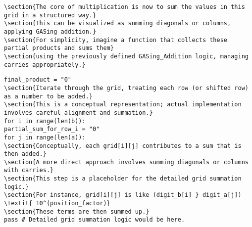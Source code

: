\begin{verbatim}
\section{The core of multiplication is now to sum the values in this grid in a structured way.}
\section{This can be visualized as summing diagonals or columns, applying GASing addition.}
\section{For simplicity, imagine a function that collects these partial products and sums them}
\section{using the previously defined GASing_Addition logic, managing carries appropriately.}
\end{verbatim}

\begin{verbatim}
final_product = "0"
\section{Iterate through the grid, treating each row (or shifted row) as a number to be added.}
\section{This is a conceptual representation; actual implementation involves careful alignment and summation.}
for i in range(len(b)):
partial_sum_for_row_i = "0"
for j in range(len(a)):
\section{Conceptually, each grid[i][j] contributes to a sum that is then added.}
\section{A more direct approach involves summing diagonals or columns with carries.}
\section{This step is a placeholder for the detailed grid summation logic.}
\section{For instance, grid[i][j] is like (digit_b[i] } digit_a[j]) \textit{ 10^(position_factor)}
\section{These terms are then summed up.}
pass # Detailed grid summation logic would be here.
\end{verbatim}

